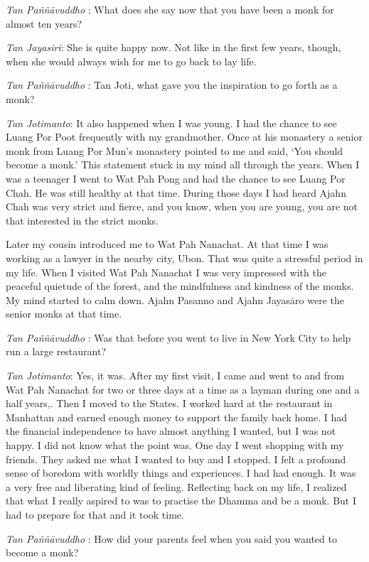 \emph{Tan Paññāvuddho} : What does she say now that you have been a monk
for almost ten years?

\emph{Tan Jayasiri}: She is quite happy now. Not like in the first few
years, though, when she would always wish for me to go back to lay life.

\emph{Tan Paññāvuddho} : Tan Joti, what gave you the inspiration to go
forth as a monk?

\emph{Tan Jotimanto}: It also happened when I was young. I had the
chance to see Luang Por Poot frequently with my grandmother. Once at his
monastery a senior monk from Luang Por Mun's monastery pointed to me and
said, `You should become a monk.' This statement stuck in my mind all
through the years. When I was a teenager I went to Wat Pah Pong and had
the chance to see Luang Por Chah. He was still healthy at that time.
During those days I had heard Ajahn Chah was very strict and fierce, and
you know, when you are young, you are not that interested in the strict
monks.

Later my cousin introduced me to Wat Pah Nanachat. At that time I was
working as a lawyer in the nearby city, Ubon. That was quite a stressful
period in my life. When I visited Wat Pah Nanachat I was very impressed
with the peaceful quietude of the forest, and the mindfulness and
kindness of the monks. My mind started to calm down. Ajahn Pasanno and
Ajahn Jayasāro were the senior monks at that time.

\emph{Tan Paññāvuddho} : Was that before you went to live in New York
City to help run a large restaurant?

\emph{Tan Jotimanto}: Yes, it was. After my first visit, I came and went
to and from Wat Pah Nanachat for two or three days at a time as a layman
during one and a half years,. Then I moved to the States. I worked hard
at the restaurant in Manhattan and earned enough money to support the
family back home. I had the financial independence to have almost
anything I wanted, but I was not happy. I did not know what the point
was. One day I went shopping with my friends. They asked me what I
wanted to buy and I stopped. I felt a profound sense of boredom with
worldly things and experiences. I had had enough. It was a very free and
liberating kind of feeling. Reflecting back on my life, I realized that
what I really aspired to was to practise the Dhamma and be a monk. But I
had to prepare for that and it took time.

\emph{Tan Paññāvuddho} : How did your parents feel when you said you
wanted to become a monk?

